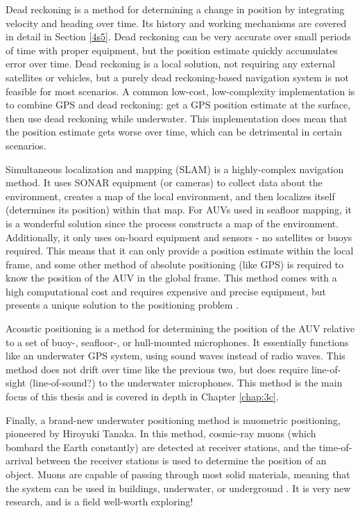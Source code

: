 \documentclass[12pt,a4paper]{report}
\begin{document}
Dead reckoning is a method for determining a change in position by integrating velocity and heading over time. Its history and working mechanisms are covered in detail in Section \ref{4s5}. Dead reckoning can be very accurate over small periods of time with proper equipment, but the position estimate quickly accumulates error over time. Dead reckoning is a local solution, not requiring any external satellites or vehicles, but a purely dead reckoning-based navigation system is not feasible for most scenarios. A common low-cost, low-complexity implementation is to combine GPS and dead reckoning: get a GPS position estimate at the surface, then use dead reckoning while underwater. This implementation does mean that the position estimate gets worse over time, which can be detrimental in certain scenarios.

Simultaneous localization and mapping (SLAM) is a highly-complex navigation method. It uses SONAR equipment (or cameras) to collect data about the environment, creates a map of the local environment, and then localizes itself (determines its position) within that map. For AUVs used in seafloor mapping, it is a wonderful solution since the process constructs a map of the environment. Additionally, it only uses on-board equipment and sensors - no satellites or buoys required. This means that it can only provide a position estimate within the local frame, and some other method of absolute positioning (like GPS) is required to know the position of the AUV in the global frame. This method comes with a high computational cost and requires expensive and precise equipment, but presents a unique solution to the positioning problem \cite{surveyurpn}.

Acoustic positioning is a method for determining the position of the AUV relative to a set of buoy-, seafloor-, or hull-mounted microphones. It essentially functions like an underwater GPS system, using sound waves instead of radio waves. This method does not drift over time like the previous two, but does require line-of-sight (line-of-sound?) to the underwater microphones. This method is the main focus of this thesis and is covered in depth in Chapter \ref{chap:3c}.

Finally, a brand-new underwater positioning method is muometric positioning, pioneered by Hiroyuki Tanaka. In this method, cosmic-ray muons (which bombard the Earth constantly) are detected at receiver stations, and the time-of-arrival between the receiver stations is used to determine the position of an object. Muons are capable of passing through most solid materials, meaning that the system can be used in buildings, underwater, or underground \cite{muons}. It is very new research, and is a field well-worth exploring!
\end{document}
